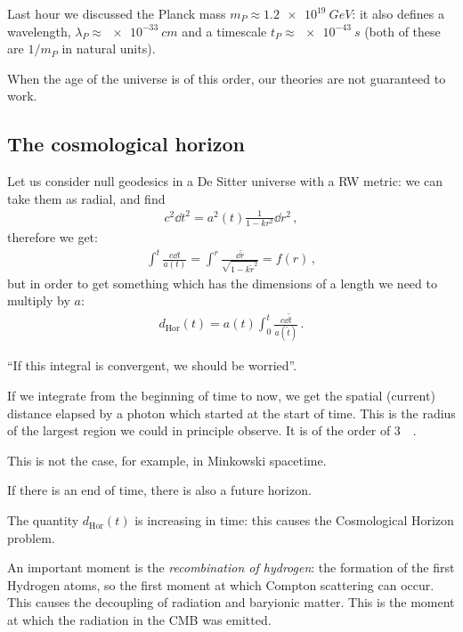 \documentclass[main.tex]{subfiles}
\begin{document}
Last hour we discussed the Planck mass \(m_P \approx \SI{1.2e19}{GeV}\): it also defines a wavelength, \(\lambda_{P} \approx \SI{e-33}{cm}\) and a timescale \(t_{P} \approx \SI{e-43}{s}\) (both of these are \(1/m_P\) in natural units).

When the age of the universe is of this order, our theories are not guaranteed to work. 

\subsection{The cosmological horizon}

Let us consider null geodesics in a De Sitter universe with a RW metric: we can take them as radial, and find 
%
\begin{align}
  c^2 \dd{t^2} = a^2(t) \frac{1}{1-kr^2} \dd{r^2} 
\,,
\end{align}
%
therefore we get: 
%
\begin{align}
  \int^{t} \frac{c \dd{t}}{a(t)} = \int^r \frac{ \dd{\widetilde{r}} }{\sqrt{1-k \widetilde{r}^2}} = f(r)
\,,
\end{align}
%
but in order to get something which has the dimensions of a length we need to multiply by \(a\): 
%
\begin{align}
  d _{\text{Hor}} (t) = a(t) \int_0^{t} \frac{c \dd{\widetilde{t}}}{a(\widetilde{t})}
\,.
\end{align}

``If this integral is convergent, we should be worried''.

If we integrate from the beginning of time to now, we get the spatial (current) distance elapsed by a photon which started at the start of time. This is the radius of the largest region we could in principle observe. It is of the order of \SI{3}{\giga\parsec}.

This is not the case, for example, in Minkowski spacetime.

If there is an end of time, there is also a future horizon.

The quantity \(d _{\text{Hor}} (t) \) is increasing in time: this causes the Cosmological Horizon problem.


An important moment is the \emph{recombination of hydrogen}: the formation of the first Hydrogen atoms, so the first moment at which Compton scattering can occur.
This causes the decoupling of radiation and baryionic matter.
This is the moment at which the radiation in the CMB was emitted.
\end{document}
